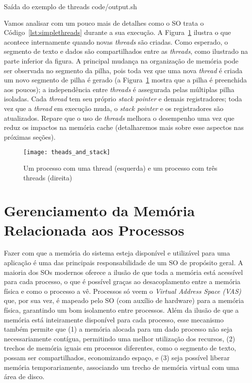 \begin{ruledcaption}{Saída do exemplo de threads\label{lst:simpleThreadOutput}}
 {code/output.sh}
\end{ruledcaption}

Vamos analisar com um pouco mais de detalhes como o SO trata o
Código~\ref{lst:simplethreads} durante a sua execução. A
Figura~\ref{fig:stack_threads} ilustra o que acontece internamente quando novas
\emph{threads} são criadas. Como esperado, o segmento de texto e dados são
compartilhados entre as \emph{threads}, como ilustrado na parte inferior da
figura. A principal mudança na organização de memória pode ser observada no
segmento da pilha, pois toda vez que uma nova \emph{thread} é criada um
novo segmento de pilha é gerado (a Figura~\ref{fig:stack_threads} mostra
que a pilha é preenchida aos poucos); a independência entre
\emph{threads} é assegurada pelas múltiplas pilha isoladas. Cada \emph{thread}
tem seu próprio \emph{stack pointer} e demais registradores; toda vez que a
\emph{thread} em execução muda, o \emph{stack pointer} e os registradores são
atualizados. Repare que o uso de \emph{threads} melhora o desempenho uma vez
que reduz os impactos na memória cache (detalharemos mais sobre esse aspectos
nas próximas seções).

\begin{figure}[!h]
  \centering
  \texttt{[image: theads\_and\_stack]} 
  \caption{Um processo com uma thread (esquerda) e um processo com três threads (direita)}
  \label{fig:stack_threads} 
\end{figure}

\section{Gerenciamento da Memória Relacionada aos Processos}

Fazer com que a memória do sistema esteja disponível e utilizável para uma
aplicação é uma das principais responsabilidade de um SO de propósito geral. A
maioria dos SOs modernos oferece a ilusão de que toda a memória está acessível
para cada processo, o que é possível graças ao desacoplamento entre a memória
física e como o processo a vê. Processos só veem o \emph{Virtual Address Space
(VAS)} que, por sua vez, é mapeado pelo SO (com auxílio de hardware) para a
memória física, garantindo um bom isolamento entre processos. Além da ilusão de
que a memória está inteiramente disponível para cada processo, esse mecanismo
também permite que (1) a memória alocada para um dado processo não seja
necessariamente contígua, permitindo uma melhor utilização dos recursos, (2)
trechos de memória iguais em processos diferentes, como o segmento de texto,
possam ser compartilhados, economizando espaço, e (3) seja possível liberar
memória temporariamente, associando um trecho de memória virtual com uma área
de disco.

